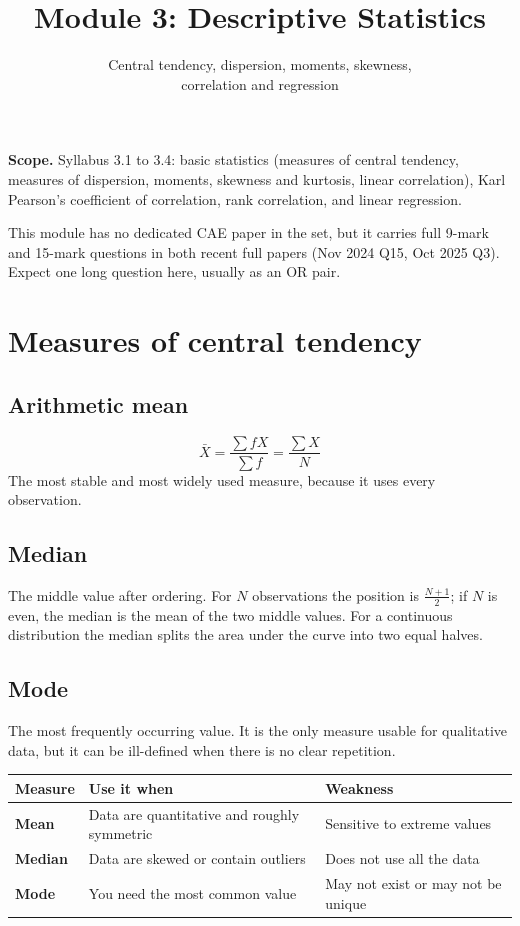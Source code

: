 \documentclass[11pt,a4paper]{article}
\title{\textbf{Module 3: Descriptive Statistics}\\}
\author{\large Central tendency, dispersion, moments, skewness,\\correlation and regression}
\date{}
\begin{document}
\maketitle

\begin{exambox}
\textbf{Scope.} Syllabus 3.1 to 3.4: basic statistics (measures of central tendency, measures of dispersion, moments, skewness and kurtosis, linear correlation), Karl Pearson's coefficient of correlation, rank correlation, and linear regression.

This module has no dedicated CAE paper in the set, but it carries full 9-mark and 15-mark questions in both recent full papers (Nov 2024 Q15, Oct 2025 Q3). Expect one long question here, usually as an OR pair.
\end{exambox}

\tableofcontents
\newpage

\section{Measures of central tendency}

\subsection{Arithmetic mean}
\[
\boxed{\bar X=\frac{\sum fX}{\sum f}=\frac{\sum X}{N}}
\]
The most stable and most widely used measure, because it uses every observation.

\subsection{Median}
The middle value after ordering. For $N$ observations the position is $\frac{N+1}{2}$; if $N$ is even, the median is the mean of the two middle values. For a continuous distribution the median splits the area under the curve into two equal halves.

\subsection{Mode}
The most frequently occurring value. It is the only measure usable for qualitative data, but it can be ill-defined when there is no clear repetition.

\begin{center}\small
\begin{tabularx}{\textwidth}{>{\bfseries}p{} X X}
\toprule Measure & Use it when & Weakness\\\midrule
Mean & Data are quantitative and roughly symmetric & Sensitive to extreme values\\
Median & Data are skewed or contain outliers & Does not use all the data\\
Mode & You need the most common value & May not exist or may not be unique\\\bottomrule
\end{tabularx}
\end{center}
\end{document}
